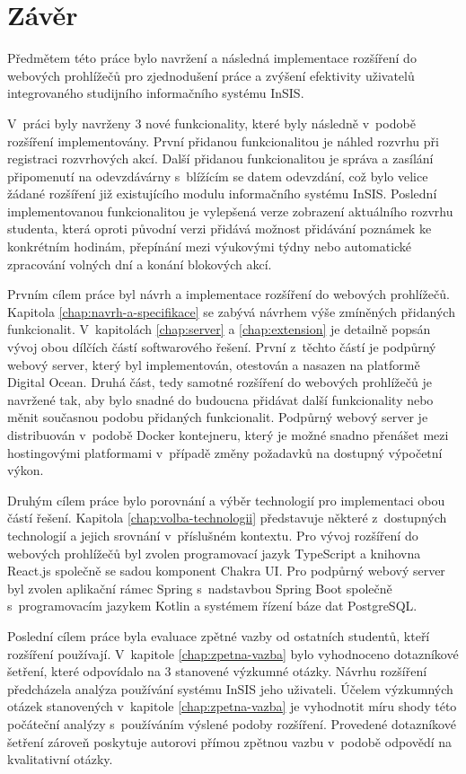 \chapter*{Závěr}

Předmětem této práce bylo navržení a následná implementace rozšíření do webových prohlížečů pro zjednodušení práce a zvýšení efektivity uživatelů integrovaného studijního informačního systému InSIS.

V~práci byly navrženy 3 nové funkcionality, které byly následně v~podobě rozšíření implementovány. První přidanou funkcionalitou je náhled rozvrhu při registraci rozvrhových akcí. Další přidanou funkcionalitou je správa a zasílání připomenutí na odevzdávárny s~blížícím se datem odevzdání, což bylo velice žádané rozšíření již existujícího modulu informačního systému InSIS. Poslední implementovanou funkcionalitou je vylepšená verze zobrazení aktuálního rozvrhu studenta, která oproti původní verzi přidává možnost přidávání poznámek ke konkrétním hodinám, přepínání mezi výukovými týdny nebo automatické zpracování volných dní a konání blokových akcí.

Prvním cílem práce byl návrh a implementace rozšíření do webových prohlížečů. Kapitola \ref{chap:navrh-a-specifikace} se zabývá návrhem výše zmíněných přidaných funkcionalit. V~kapitolách \ref{chap:server} a \ref{chap:extension} je detailně popsán vývoj obou dílčích částí softwarového řešení. První z~těchto částí je podpůrný webový server, který byl implementován, otestován a nasazen na platformě Digital Ocean. Druhá část, tedy samotné rozšíření do webových prohlížečů je navržené tak, aby bylo snadné do budoucna přidávat další funkcionality nebo měnit současnou podobu přidaných funkcionalit. Podpůrný webový server je distribuován v~podobě Docker kontejneru, který je možné snadno přenášet mezi hostingovými platformami v~případě změny požadavků na dostupný výpočetní výkon. 

Druhým cílem práce bylo porovnání a výběr technologií pro implementaci obou částí řešení. Kapitola \ref{chap:volba-technologii} představuje některé z~dostupných technologií a jejich srovnání v~příslušném kontextu. Pro vývoj rozšíření do webových prohlížečů byl zvolen programovací jazyk TypeScript a knihovna React.js společně se sadou komponent Chakra UI. Pro podpůrný webový server byl zvolen aplikační rámec Spring s~nadstavbou Spring Boot společně s~programovacím jazykem Kotlin a systémem řízení báze dat PostgreSQL. 

Poslední cílem práce byla evaluace zpětné vazby od ostatních studentů, kteří rozšíření používají. V~kapitole \ref{chap:zpetna-vazba} bylo vyhodnoceno dotazníkové šetření, které odpovídalo na 3 stanovené výzkumné otázky. Návrhu rozšíření předcházela analýza používání systému InSIS jeho uživateli. Účelem výzkumných otázek stanovených v~kapitole \ref{chap:zpetna-vazba} je vyhodnotit míru shody této počáteční analýzy s~používáním výslené podoby rozšíření. Provedené dotazníkové šetření zároveň poskytuje autorovi přímou zpětnou vazbu v~podobě odpovědí na kvalitativní otázky.

